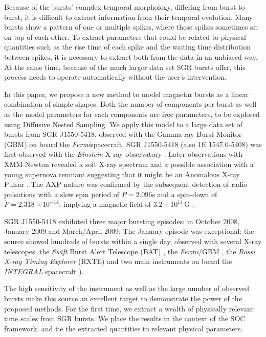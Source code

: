 \documentclass[12pt]{emulateapj}
\newcommand{\project}[1]{\textsl{#1}}
\newcommand{\Fermi}{\project{Fermi}}
\begin{document}

Because of the bursts' complex temporal morphology, differing from burst to burst, it is difficult to extract information from their temporal evolution. 
Many bursts show a pattern of one or multiple spikes, where these spikes sometimes sit on top of each other. To extract parameters that could be related
to physical quantities such as the rise time of each spike and the waiting time distribution between spikes, it is necessary to 
extract both from the data in an unbiased way. At the same time, because of the much larger data set SGR bursts offer, this process
needs to operate automatically without the user's intervention.

In this paper, we propose a new method to model magnetar bursts as a linear combination of simple shapes. Both the number of components
per burst as well as the model parameters for each components are free parameters, to be explored using Diffusive Nested Sampling.
We apply this model to a large data set of bursts from SGR J1550-5418, observed with the Gamma-ray Burst Monitor (GBM) on board the 
\Fermi spacecraft, 
SGR J1550-5418 (also 1E 1547.0-5408) was first observed with the {\it Einstein} X-ray observatory \citep{lamb81}. Later observations with XMM-Newton revealed a soft X-ray spectrum and a possible association with a young supernova remnant suggesting that it might be an Anomalous X-ray Pulsar \citep[AXP][]{gelfand07}. The AXP nature was confirmed  by the subsequent detection of radio pulsations with a slow spin period of $P = 2.096\mathrm{s}$ and a spin-down of $\dot{P} = 2.318 \times 10^{-14}$, implying a magnetic field of $3.2 \times 10^{14} \, \mathrm{G}$ \citep{Camilo07}. 

SGR J1550-5418 exhibited three major bursting episodes: in October 2008, January 2009 and March/April 2009. The January episode was exceptional: the source showed hundreds of bursts within a single day, observed with several X-ray telescopes: the {\it Swift} Burst Alert Telescope (BAT) \citep{israel10, scholz11}, the \Fermi/GBM \citep{kaneko10,vonkienlin12,vanderhorst12}, the {\it Rossi X-ray Timing Explorer} (RXTE) \citep{dib12} and two main instruments on board the {\it INTEGRAL} spacecraft \citep{mereghetti09, savchenko10}).

The high sensitivity of the instrument as well as the large number of observed bursts make this source an excellent target to demonstrate the power of the proposed methods. For the first time, we extract a wealth of 
physically relevant time scales from SGR bursts. We place the results in the context of the SOC framework, and tie the extracted quantities to relevant physical parameters.
\end{document}
